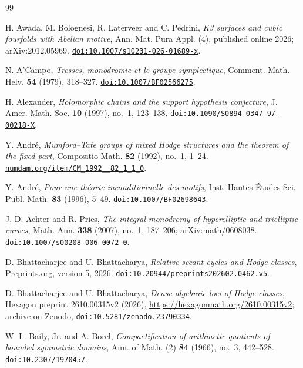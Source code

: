 \documentclass[11pt,reqno]{amsart}
\theoremstyle{plain}
\theoremstyle{definition}
\theoremstyle{remark}
\begin{document}
\begin{thebibliography}{99}

H. Awada, M. Bolognesi, R. Laterveer and C. Pedrini,
\emph{K3 surfaces and cubic fourfolds with Abelian motive},
Ann. Mat. Pura Appl. (4), published online 2026; arXiv:2012.05969.
\href{https://doi.org/10.1007/s10231-026-01689-x}{\texttt{doi:10.1007/s10231-026-01689-x}}.

N. A'Campo,
\emph{Tresses, monodromie et le groupe symplectique},
Comment. Math. Helv. \textbf{54} (1979), 318--327.
\href{https://doi.org/10.1007/BF02566275}{\texttt{doi:10.1007/BF02566275}}.

H. Alexander,
\emph{Holomorphic chains and the support hypothesis conjecture},
J. Amer. Math. Soc. \textbf{10} (1997), no.~1, 123--138.
\href{https://doi.org/10.1090/S0894-0347-97-00218-X}{\texttt{doi:10.1090/S0894-0347-97-00218-X}}.

Y. Andr\'e,
\emph{Mumford--Tate groups of mixed Hodge structures and the theorem of the
fixed part},
Compositio Math. \textbf{82} (1992), no.~1, 1--24.
\href{http://www.numdam.org/item/CM_1992__82_1_1_0/}{\texttt{numdam.org/item/CM\_1992\_\_82\_1\_1\_0}}.

Y. Andr\'e,
\emph{Pour une th\'eorie inconditionnelle des motifs},
Inst. Hautes \'Etudes Sci. Publ. Math. \textbf{83} (1996), 5--49.
\href{https://doi.org/10.1007/BF02698643}{\texttt{doi:10.1007/BF02698643}}.

J. D. Achter and R. Pries,
\emph{The integral monodromy of hyperelliptic and trielliptic curves},
Math. Ann. \textbf{338} (2007), no.~1, 187--206; arXiv:math/0608038.
\href{https://doi.org/10.1007/s00208-006-0072-0}{\texttt{doi:10.1007/s00208-006-0072-0}}.

D. Bhattacharjee and U. Bhattacharya,
\emph{Relative secant cycles and Hodge classes},
Preprints.org, version 5, 2026.
\href{https://doi.org/10.20944/preprints202602.0462.v5}{\texttt{doi:10.20944/preprints202602.0462.v5}}.

D. Bhattacharjee and U. Bhattacharya,
\emph{Dense algebraic loci of Hodge classes},
Hexagon preprint 2610.00315v2 (2026), \url{https://hexagonmath.org/2610.00315v2};
archive on Zenodo, \href{https://doi.org/10.5281/zenodo.23790334}{\texttt{doi:10.5281/zenodo.23790334}}.

W. L. Baily, Jr. and A. Borel,
\emph{Compactification of arithmetic quotients of bounded symmetric domains},
Ann. of Math. (2) \textbf{84} (1966), no.~3, 442--528.
\href{https://doi.org/10.2307/1970457}{\texttt{doi:10.2307/1970457}}.


\end{thebibliography}
\end{document}
